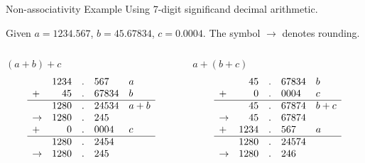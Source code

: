\documentclass[presentation]{beamer}
\begin{document}
\begin{frame}[label={sec:orgheadline9}]{Non-associativity Example}
Using 7-digit significand decimal arithmetic.

Given \(a = 1234.567\), \(b = 45.67834\), \(c = 0.0004\).
The symbol \(\rightarrow\) denotes rounding.

\begin{columns}
\begin{column}{0.5\columnwidth}
\begin{block}{\((a + b) + c\)}
\[\begin{array}{lrcll}
    & 1234 & . & 567 & a\\ + & 45 & . & 67834 & b\\ \hline & 1280
    & . & 24534 & a + b\\ \rightarrow & 1280 & . & 245\\ + & 0 & . &
    0004 & c\\ \hline & 1280 & . & 2454 & \\ \rightarrow
    & 1280 & . & 245 & \end{array}
    \]
\end{block}
\end{column}


\begin{column}{0.5\columnwidth}
\begin{block}{\(a + (b + c)\)}
\[\begin{array}{lrcll} & 45 & . & 67834 & b\\ + & 0 & . & 0004 & c
    \\\hline & 45 & . & 67874 & b + c\\\rightarrow & 45 & . & 67874
    &\\ + & 1234 & . & 567 & a\\\hline & 1280 & . & 24574 &
    \\\rightarrow & 1280 & . & 246 & \end{array}\]
\end{block}
\end{column}
\end{columns}
\end{frame}
\end{document}
